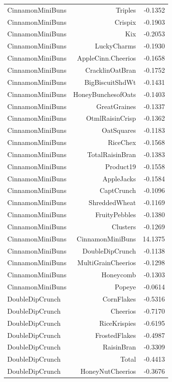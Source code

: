 \begin{longtable}{@{}lrr@{}}
CinnamonMiniBuns & Triples & -0.1352 \\
CinnamonMiniBuns & Crispix & -0.1903 \\
CinnamonMiniBuns & Kix & -0.2053 \\
CinnamonMiniBuns & LuckyCharms & -0.1930 \\
CinnamonMiniBuns & AppleCinn.Cheerios & -0.1658 \\
CinnamonMiniBuns & CracklinOatBran & -0.1752 \\
CinnamonMiniBuns & BigBiscuitShdWt & -0.1431 \\
CinnamonMiniBuns & HoneyBunchesofOats & -0.1403 \\
CinnamonMiniBuns & GreatGraines & -0.1337 \\
CinnamonMiniBuns & OtmlRaisinCrisp & -0.1362 \\
CinnamonMiniBuns & OatSquares & -0.1183 \\
CinnamonMiniBuns & RiceChex & -0.1568 \\
CinnamonMiniBuns & TotalRaisinBran & -0.1383 \\
CinnamonMiniBuns & Product19 & -0.1558 \\
CinnamonMiniBuns & AppleJacks & -0.1584 \\
CinnamonMiniBuns & CaptCrunch & -0.1096 \\
CinnamonMiniBuns & ShreddedWheat & -0.1169 \\
CinnamonMiniBuns & FruityPebbles & -0.1380 \\
CinnamonMiniBuns & Clusters & -0.1269 \\
CinnamonMiniBuns & CinnamonMiniBuns & 14.1375 \\
CinnamonMiniBuns & DoubleDipCrunch & -0.1138 \\
CinnamonMiniBuns & MultiGrainCheerios & -0.1298 \\
CinnamonMiniBuns & Honeycomb & -0.1303 \\
CinnamonMiniBuns & Popeye & -0.0614 \\
DoubleDipCrunch & CornFlakes & -0.5316 \\
DoubleDipCrunch & Cheerios & -0.7170 \\
DoubleDipCrunch & RiceKrispies & -0.6195 \\
DoubleDipCrunch & FrostedFlakes & -0.4987 \\
DoubleDipCrunch & RaisinBran & -0.3309 \\
DoubleDipCrunch & Total & -0.4413 \\
DoubleDipCrunch & HoneyNutCheerios & -0.3676 \\

\end{longtable}
